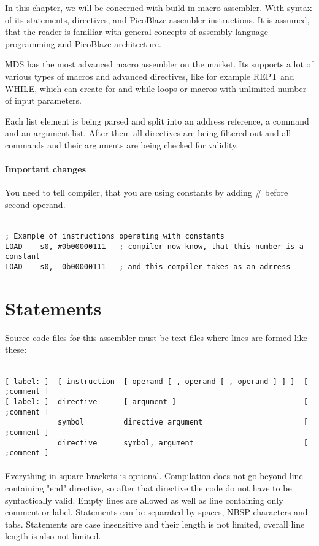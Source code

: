 In this chapter, we will be concerned with build-in macro assembler. With syntax of its statements, directives, and PicoBlaze assembler instructions. It is assumed, that the reader is familiar with general concepts of assembly language programming and PicoBlaze architecture.

MDS has the most advanced macro assembler on the market. Its supports a lot of various types of macros and advanced directives, like for example REPT and WHILE, which can create for and while loops or  macros with unlimited number of input parameters.

Each list element is being parsed and split into an address reference, a command and an argument list. After them all directives are being filtered out and all commands and their arguments are being checked for validity.

\paragraph{Important changes}
    You need to tell compiler, that you are using constants by adding \# before second operand.

    {
        ~\\
        \usecodefont
        \verb'; Example of instructions operating with constants'\\
        \verb'LOAD    s0, #0b00000111   ; compiler now know, that this number is a constant'\\
        \verb'LOAD    s0,  0b00000111   ; and this compiler takes as an adrress'\\
    }

\section{Statements}
    Source code files for this assembler must be text files where lines are formed like these:

    {
        ~\\
        \usecodefont
        \verb'[ label: ]  [ instruction  [ operand [ , operand [ , operand ] ] ]  [ ;comment ]'\\
        \verb'[ label: ]  directive      [ argument ]                             [ ;comment ]'\\
        \verb'            symbol         directive argument                       [ ;comment ]'\\
        \verb'            directive      symbol, argument                         [ ;comment ]'\\\\
    }
    Everything in square brackets is optional. Compilation does not go beyond line containing "end" directive, so after that directive the code do not have to be syntactically valid. Empty lines are allowed as well as line containing only comment or label. Statements can be separated by spaces, NBSP characters and tabs. Statements are case insensitive and their length is not limited, overall line length is also not limited.

